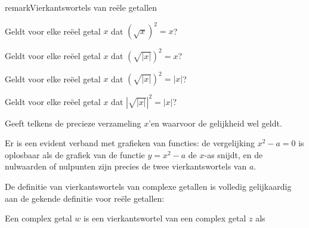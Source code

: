 \documentclass{ximera}
\begin{document}
\begin{expandable}{remark}{Vierkantswortels van reële getallen}
        \begin{quickquestion*}{} Geldt voor elke reëel getal $x$ dat $(\sqrt{x})^2 = x$?\end{quickquestion*}
        \begin{quickquestion*}{} Geldt voor elke reëel getal $x$ dat $(\sqrt{|x|})^2 = x$?\end{quickquestion*}
        \begin{quickquestion*}{} Geldt voor elke reëel getal $x$ dat $(\sqrt{|x|})^2 = |x|$?\end{quickquestion*}
        \begin{quickquestion*}{} Geldt voor elke reëel getal $x$ dat $|\sqrt{|x|}|^2 = |x|$?\end{quickquestion*}
        \begin{quickquestion*}{} Geeft telkens de precieze verzameling $x$'en waarvoor de gelijkheid wel geldt.\end{quickquestion*}


        Er is een evident verband met grafieken van functies: de vergelijking $x^2-a=0$ is oplosbaar als de grafiek van de functie $y=x^2-a$ de $x$-as snijdt, en de nulwaarden of nulpunten zijn precies de twee vierkantswortels van $a$.

    \end{expandable}


    De definitie van vierkantswortels van complexe getallen is volledig gelijkaardig aan de gekende definitie voor reële getallen:
    \begin{definition}\nl

        Een complex getal $w$ is een {vierkantswortel} van een complex getal $z$ als 
    \end{definition}
\end{document}
